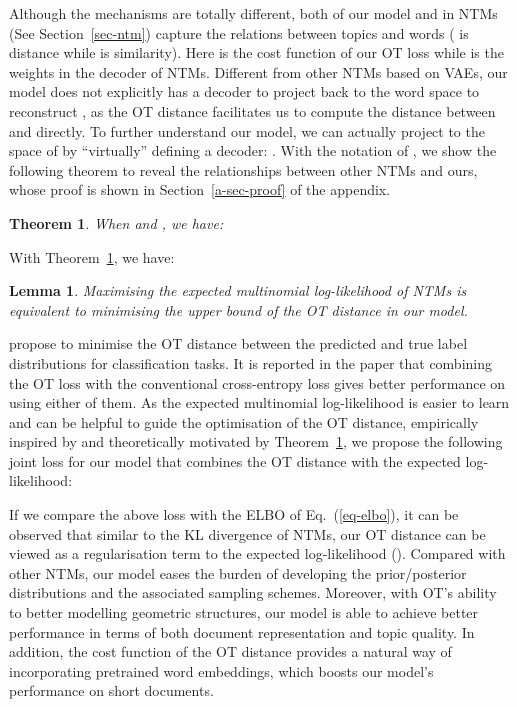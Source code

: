 \documentclass{article}
\newtheorem{thm}{Theorem}
\newtheorem{lemma}{Lemma}
\begin{document}
Although the mechanisms are totally different, both  of our model and  in NTMs (See Section~\ref{sec-ntm}) capture the relations between topics and words ( is distance while  is similarity).
Here  is the cost function of our OT loss while  is the weights in the decoder of NTMs.
Different from other NTMs based on VAEs, our model does not explicitly has a decoder to project  back to the word space to reconstruct , as the OT distance facilitates us to compute the distance between  and  directly.
To further understand our model, we can actually project  to the space of  by ``virtually'' defining a decoder: . With the notation of , we show the following theorem to reveal the relationships between other NTMs and ours, whose proof is shown in Section~\ref{a-sec-proof} of the appendix.
\begin{thm}
\label{thm}
When  and , we have:
 
\end{thm}

With Theorem~\ref{thm}, we have:
\begin{lemma}
Maximising the expected multinomial log-likelihood of NTMs is equivalent to minimising the upper bound of the OT distance in our model.
\end{lemma}

\citet{frogner2015learning} propose to minimise the OT distance between the predicted and true label distributions for classification tasks.
It is reported in the paper that combining the OT loss with the conventional cross-entropy loss gives better performance on using either of them.
As the expected multinomial log-likelihood is easier to learn and can be helpful to guide the optimisation of the OT distance, empirically inspired by \citet{frogner2015learning} and theoretically motivated by Theorem~\ref{thm}, we propose the following joint loss for our model that combines the OT distance with the expected log-likelihood:


If we compare the above loss with the ELBO of Eq.~(\ref{eq-elbo}), it can be observed that similar to the KL divergence of NTMs, our OT distance can be viewed as a regularisation term to the expected log-likelihood ().
Compared with other NTMs, our model eases the burden of developing the prior/posterior distributions and the associated sampling schemes. 
Moreover, with OT's ability to better modelling geometric structures, our model is able to achieve better performance in terms of both document representation and topic quality.
In addition, the cost function of the OT distance provides a natural way of incorporating pretrained word embeddings, which boosts our model's performance on short documents.
\end{document}
